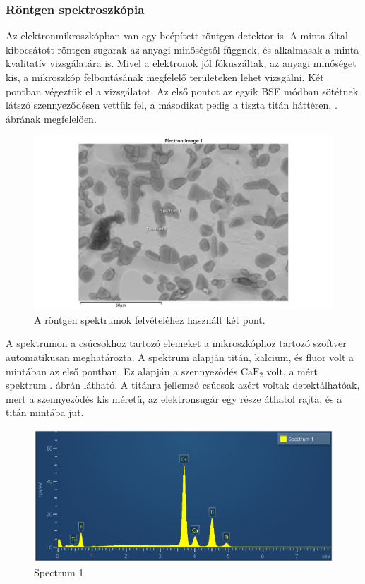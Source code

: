\documentclass[pdftex,12pt,a4paper]{article}
\begin{document}
		\subsubsection{Röntgen spektroszkópia}
			Az elektronmikroszkópban van egy beépített röntgen detektor is. A minta által kibocsátott röntgen sugarak az anyagi minőségtől függnek, és alkalmasak a minta kvalitatív vizsgálatára is. Mivel a elektronok jól fókuszáltak, az anyagi minőséget kis, a mikroszkóp felbontásának megfelelő területeken lehet vizsgálni. Két pontban végeztük el a vizsgálatot. Az első pontot az egyik BSE módban sötétnek látszó szennyeződésen vettük fel, a másodikat pedig a tiszta titán háttéren, . ábrának megfelelően.
			\begin{figure}[H]
				\centering
				\includegraphics[scale=0.7]{./figs/spots.png}
				\caption{A röntgen spektrumok felvételéhez használt két pont.}
				\label{spots}
			\end{figure}
			A spektrumon a csúcsokhoz tartozó elemeket a mikroszkóphoz tartozó szoftver automatikusan meghatározta. A spektrum alapján titán, kalcium, és fluor volt a mintában az első pontban. Ez alapján a szennyeződés $\text{CaF}_2$ volt, a mért spektrum . ábrán látható. A titánra jellemző csúcsok azért voltak detektálhatóak, mert a szennyeződés kis méretű, az elektronsugár egy része áthatol rajta, és a titán mintába jut.
			\begin{figure}[H]
				\centering
				\includegraphics[scale=0.7]{./figs/spectrum1.png}
				\caption{Spectrum 1}
				\label{spectrum1}
			\end{figure}
\end{document}
